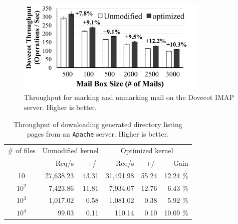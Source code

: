 \begin{figure}
\scriptsize
\centering
\includegraphics[width=3.6in]{dcache/plots/dovecot.pdf}
\vspace{-5pt}
\caption[Directory cache optimization: the Dovecot IMAP server throughput.]
{Throughput for marking and unmarking mail on the Dovecot IMAP server. Higher is better. }
\label{fig:dcache:dovecot}
\end{figure}

\begin{table}[t]
\scriptsize
\centering
\begin{tabular}{|c|rr|rrr|}
\hline
\# of files & \multicolumn{2}{c|}{Unmodified kernel} & \multicolumn{3}{c|}{Optimized kernel} \\
& Req/s & +/- & Req/s & +/- & Gain\\
\hline
    10 &     27,638.23 & 43.31 & 31,491.98 & 55.24 & 12.24 \% \\
\hline
$10^2$ &      7,423.86 & 11.81 &  7,934.07 & 12.76 &  6.43 \% \\
\hline
$10^3$ &      1,017.02 &  0.58 &  1,081.02 &  0.38 &  5.92 \% \\
\hline
$10^4$ &         99.03 &  0.11 &    110.14 &  0.10 & 10.09 \% \\
\hline
\end{tabular}
\caption[The optimized Apache server throughput.]
{Throughput of downloading generated directory listing pages from an {\tt Apache} server. Higher is better.}
\label{tab:dcache:apache}
\end{table}

